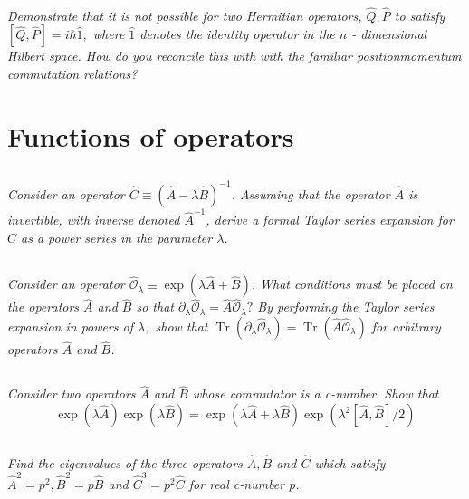 \documentclass[12pt, letterpaper]{article}
\begin{document}
\subsection{}
\textit{Demonstrate that it is not possible for two Hermitian operators, $\hat{Q}, \hat{P}$ to satisfy $[\hat{Q}, \hat{P}]=i \hbar \hat{1},$ where $\hat{1}$ denotes the identity operator in the $n$ - dimensional Hilbert space. How do you reconcile this with with the familiar positionmomentum commutation relations?}

\section{Functions of operators}
\subsection{}
\textit{Consider an operator $\hat{C} \equiv(\hat{A}-\lambda \hat{B})^{-1}$. Assuming that the operator $\hat{A}$ is invertible, with inverse denoted $\hat{A}^{-1}$, derive a formal Taylor series expansion for $\hat{C}$ as a power series in the parameter $\lambda$.}
\subsection{}
\textit{Consider an operator $\hat{\mathcal{O}}_{\lambda} \equiv \exp (\lambda \hat{A}+\hat{B})$. What conditions must be placed on the operators $\hat{A}$ and $\hat{B}$ so that $\partial_{\lambda} \hat{\mathcal{O}}_{\lambda}=\hat{A} \hat{\mathcal{O}}_{\lambda} ?$ By performing the Taylor series expansion in powers of $\lambda,$ show that $\operatorname{Tr}\left(\partial_{\lambda} \hat{\mathcal{O}}_{\lambda}\right)=\operatorname{Tr}\left(\hat{A} \hat{\mathcal{O}}_{\lambda}\right)$ for
arbitrary operators $\hat{A}$ and $\hat{B}$.}
\subsection{}
\textit{Consider two operators $\hat{A}$ and $\hat{B}$ whose commutator is a c-number. Show that 
$$\exp (\lambda \hat{A}) \exp (\lambda \hat{B})=\exp \left(\lambda \hat{A}+\lambda \hat{B} \right)  \exp \left(\lambda^{2}[\hat{A}, \hat{B}] / 2\right)$$}
\subsection{}
\textit{Find the eigenvalues of the three operators $\hat{A}, \hat{B}$ and $\hat{C}$ which satisfy $\hat{A}^{2}=p^{2}, \hat{B}^{2}=p \hat{B}$ and $\hat{C}^{3}=p^{2} \hat{C}$ for real c-number $p$.}
\end{document}
